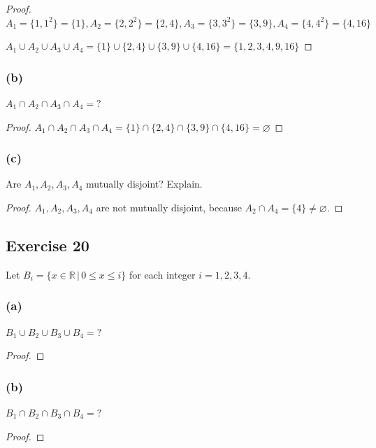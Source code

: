 \documentclass[14pt]{extarticle}
\newcommand{\es}{\varnothing}
\newcommand{\R}{\mathbb{R}}
\begin{document}
\begin{proof}
\(A_1 = \{1, 1^2\} = \{1\}, A_2 = \{2, 2^2\} = \{2, 4\}, A_3 = \{3, 3^2\} = \{3, 9\}, A_4 = \{4, 4^2\} = \{4, 16\}\)

\(A_1 \cup A_2 \cup A_3 \cup A_4 = \{1\} \cup \{2, 4\} \cup \{3, 9\} \cup \{4, 16\} = \{1, 2, 3, 4, 9, 16\}\)
\end{proof}

\subsubsection{(b)}
\(A_1 \cap A_2 \cap A_3 \cap A_4 = ?\)

\begin{proof}
\(A_1 \cap A_2 \cap A_3 \cap A_4 = \{1\} \cap \{2, 4\} \cap \{3, 9\} \cap \{4, 16\} = \es\)
\end{proof}

\subsubsection{(c)}
Are \(A_1, A_2, A_3, A_4\) mutually disjoint? Explain.

\begin{proof}
\(A_1, A_2, A_3, A_4\) are not mutually disjoint, because \(A_2 \cap A_4 = \{4\} \neq \es\).
\end{proof}

\subsection{Exercise 20}
Let \(B_i = \{x \in \R \, | \, 0 \leq x \leq i\}\) for each integer \(i = 1, 2, 3, 4\).

\subsubsection{(a)}
\(B_1 \cup B_2 \cup B_3 \cup B_4 = ?\)

\begin{proof}

\end{proof}

\subsubsection{(b)}
\(B_1 \cap B_2 \cap B_3 \cap B_4 = ?\)

\begin{proof}

\end{proof}
\end{document}
